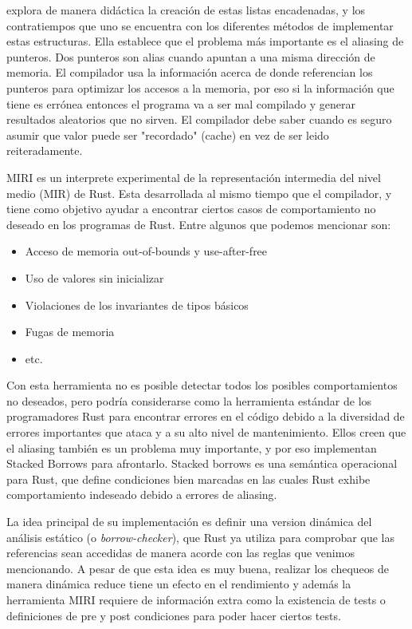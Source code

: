  explora de manera didáctica la creación de estas listas encadenadas, y los contratiempos que uno se encuentra con los diferentes métodos de implementar estas estructuras. Ella establece que el problema más importante es el aliasing de punteros. Dos punteros son alias cuando apuntan a una misma dirección de memoria. El compilador usa la información acerca de donde referencian los punteros para optimizar los accesos a la memoria, por eso si la información que tiene es errónea entonces el programa va a ser mal compilado y generar resultados aleatorios que no sirven. El compilador debe saber cuando es seguro asumir que valor puede ser "recordado" (cache) en vez de ser leido reiteradamente.

MIRI \cite{miri} es un interprete experimental de la representación intermedia del nivel medio (MIR) de Rust. Esta desarrollada al mismo tiempo que el compilador, y tiene como objetivo ayudar a encontrar ciertos casos de comportamiento no deseado en los programas de Rust. Entre algunos que podemos mencionar son:
\begin{itemize}
    \item Acceso de memoria out-of-bounds y use-after-free
    \item Uso de valores sin inicializar
    \item Violaciones de los invariantes de tipos básicos
    \item Fugas de memoria
    \item etc.
\end{itemize}
Con esta herramienta no es posible detectar todos los posibles comportamientos no deseados, pero podría considerarse como la herramienta estándar de los programadores Rust para encontrar errores en el código debido a la diversidad de errores importantes que ataca y a su alto nivel de mantenimiento. Ellos creen que el aliasing también es un problema muy importante, y por eso implementan Stacked Borrows \cite{stackedborrows} para afrontarlo. Stacked borrows es una semántica operacional  para Rust, que define condiciones bien marcadas en las cuales Rust exhibe comportamiento indeseado debido a errores de aliasing.

La idea principal de su implementación es definir una version dinámica del análisis estático (o \textit{borrow-checker}), que Rust ya utiliza para comprobar que las referencias sean accedidas de manera acorde con las reglas que venimos mencionando. A pesar de que esta idea es muy buena, realizar los chequeos de manera dinámica reduce tiene un efecto en el rendimiento y además la herramienta MIRI requiere de información extra como la existencia de tests o definiciones de pre y post condiciones para poder hacer ciertos tests.

